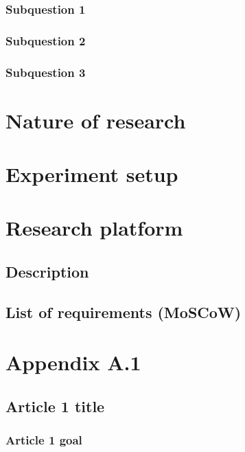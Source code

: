 \documentclass[a4paper]{article}
\begin{document}
  \subsubsection{Subquestion 1}
  \subsubsection{Subquestion 2}
  \subsubsection{Subquestion 3}
  \clearpage

  \section{Nature of research}
  \clearpage

  \section{Experiment setup}
  \clearpage

  \section{Research platform}
  \subsection{Description}
  \subsection{List of requirements (MoSCoW)}
  \clearpage

  \section{Appendix A.1} %

  \subsection{Article 1 title}
  \subsubsection{Article 1 goal}
\end{document}
